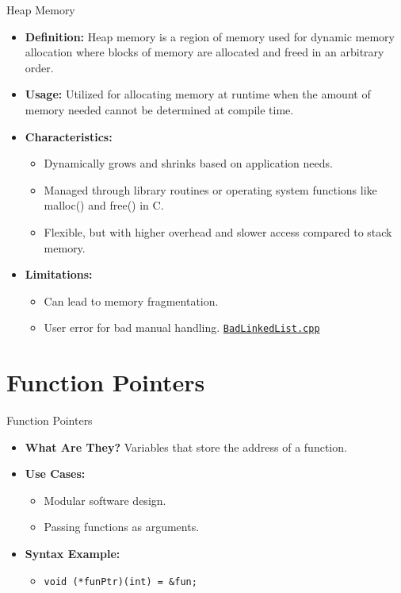 \documentclass[10pt]{beamer}
\begin{document}
\begin{frame}{Heap Memory}
  \begin{itemize}
    \item \textbf{Definition:} Heap memory is a region of memory used for dynamic memory allocation where blocks of memory are allocated and freed in an arbitrary order.
    \item \textbf{Usage:} Utilized for allocating memory at runtime when the amount of memory needed cannot be determined at compile time.
    \item \textbf{Characteristics:}
      \begin{itemize}
        \item Dynamically grows and shrinks based on application needs.
        \item Managed through library routines or operating system functions like malloc() and free() in C.
        \item Flexible, but with higher overhead and slower access compared to stack memory.
      \end{itemize}
    \item \textbf{Limitations:}
      \begin{itemize}
        \item Can lead to memory fragmentation.
        \item User error for bad manual handling. \href{run:./BadLinkedList.cpp}{\texttt{BadLinkedList.cpp}}
      \end{itemize}
  \end{itemize}
\end{frame}

\section{Function Pointers}
\begin{frame}{Function Pointers}
  \begin{itemize}
    \item \textbf{What Are They?} Variables that store the address of a function.
    \item \textbf{Use Cases:}
      \begin{itemize}
        \item Modular software design.
        \item Passing functions as arguments.
      \end{itemize}
    \item \textbf{Syntax Example:}
      \begin{itemize}
        \item \texttt{void (*funPtr)(int) = \&fun;}
      \end{itemize}
  \end{itemize}
\end{frame}
\end{document}
